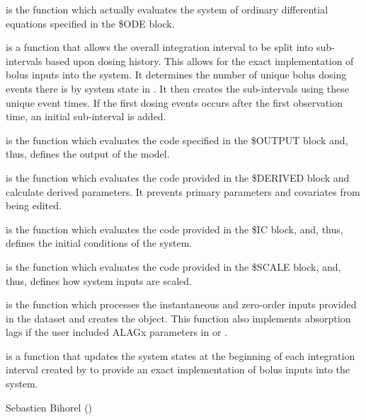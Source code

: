 \begin{Details}\relax
{} is the function which actually evaluates the system of
ordinary differential equations specified in the \$ODE block.

 is a function that allows the overall integration 
interval to be split into sub-intervals based upon dosing history.
This allows for the exact implementation of bolus inputs into the system. It
determines the number of unique bolus dosing events there is by system state 
in . It then creates the sub-intervals using these unique event 
times. If the first dosing events occurs after the first observation time, an 
initial sub-interval is added.

 is the function which evaluates the code specified in the 
\$OUTPUT block and, thus, defines the output of the model.

 is the function which evaluates the code provided in the
\$DERIVED block and calculate derived parameters. It prevents primary 
parameters and covariates from being edited.

 is the function which evaluates the code provided in the \$IC
block, and, thus, defines the initial conditions of the system.

 is the function which evaluates the code provided in the
\$SCALE block, and, thus, defines how system inputs are scaled.

 is the function which processes the instantaneous and 
zero-order inputs provided in the dataset and creates the  
object. This function also implements absorption lags if the user included
ALAGx parameters in  or .

 is a function that updates the system states at the 
beginning of each integration interval created by  to 
provide an exact implementation of bolus inputs into the system.
\end{Details}
%
\begin{Author}\relax
Sebastien Bihorel ()
\end{Author}
%
\begin{SeeAlso}\relax
{}
\end{SeeAlso}
